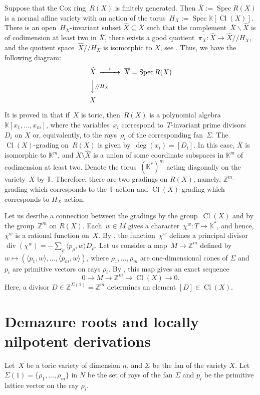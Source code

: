 \documentclass[a4paper,reqno,12pt]{amsart}
\DeclareMathOperator {\Cl}{Cl}
\DeclareMathOperator {\divisor}{div}
\DeclareMathOperator {\Spec}{Spec}
\def\Z  {\mathbb Z}
\def\K  {\mathbb K}
\theoremstyle{definition}
\begin{document}
Suppose that the Cox ring~$R(X)$ is finitely generated.
Then ${\overline{X}:=\Spec R(X)}$ is a normal affine variety with an action of the torus~$H_X := \Spec\K[\Cl(X)]$.
There is an open~$H_X$-invariant subset $\widehat{X}\subseteq \overline{X}$ such that the complement~$\overline{X}\backslash\widehat{X}$ is of codimension at least two in $\overline{X}$,
there exists a good quotient~$\pi_X\colon\widehat{X}\rightarrow\widehat{X}/\!/H_{X}$, and the quotient space~$\widehat{X}/\!/H_{X}$ is isomorphic to $X$, see \cite[Construction~1.6.3.1]{ADHL}. Thus, we have the following diagram:
\[
\begin{CD}
\widehat{X} @>{i}>> \overline{X}=\Spec R(X)\\
@VV{/\!/H_{X}}V  \\
X
\end{CD}
\]

It is proved in \cite{Cox} that if~$X$ is toric, then~$R(X)$ is a polynomial algebra~$\K[x_1,\ldots,x_m]$, where the variables~$x_i$ correspond to~$T$-invariant prime divisors~$D_i$ on $X$ or, equivalently, to the rays~$\rho_i$ of the corresponding fan~$\Sigma$.
The $\Cl(X)$-grading on~$R(X)$ is given by~$\deg(x_i)=[D_i]$.
In this case, $\overline{X}$ is isomorphic to $\K^m$, and $\overline{X}\setminus\widehat{X}$ is a union of some coordinate subspaces in $\K^m$ of codimension at least two.
Denote the torus~$(\K^{*})^m$ acting diagonally on the variety~$\overline{X}$ by $\mathbb T$.
Therefore, there are two gradings on ${R}(X)$, namely, $\Z^m$-grading which corresponds to the $\mathbb T$-action and $\Cl(X)$-grading which corresponds to $H_X$-action.


Let us desribe a connection between the gradings by the group~$\Cl(X)$ and by the group~$\Z^m$ on ${R}(X)$.
Each~$w \in M$ gives a character~${\chi^w : T \to \K^{*}}$, and hence, $\chi^w$ is a rational function on~$X$.
By \cite[Theorem 4.1.3]{CLS}, the function~$\chi^w$ defines a principal divisor~${\divisor(\chi^w) = - \sum_{\rho} \langle p_\rho,w\rangle D_\rho}$.
Let us consider a map~${M \longrightarrow \Z^{m}}$ defined by~$w \mapsto  (\langle p_1, w\rangle, \ldots, \langle p_m, w\rangle)$, where $\rho_1, \ldots, \rho_m$ are one-dimensional cones of $\Sigma$ and $p_i$ are primitive vectors on rays $\rho_i$.
By \cite[\S3.4]{Fu}, this map gives an exact sequence
  \[
    0  \longrightarrow  M  \longrightarrow  \Z^m
    \longrightarrow  \Cl(X)  \longrightarrow 0.
  \]
  Here, a divisor $D \in \Z^{\Sigma(1)}=\Z^m$ determines an element $[D] \in \Cl(X)$.


\section{Demazure roots and locally nilpotent derivations}\label{intrga}
Let~$X$ be a toric variety of dimension $n$, and $\Sigma$ be the fan of the variety $X$.
Let~${\Sigma(1)=\{\rho_1, \ldots, \rho_m\}}$ in $N$ be the set of rays of the fan $\Sigma$ and $p_i$ be the primitive lattice vector on the ray $\rho_i$.
\end{document}
